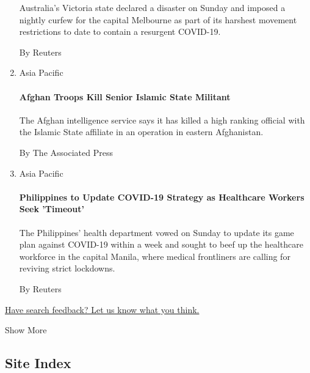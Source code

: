 \begin{enumerate}
  Australia's Victoria state declared a disaster on Sunday and imposed a
  nightly curfew for the capital Melbourne as part of its harshest
  movement restrictions to date to contain a resurgent COVID-19.

  By Reuters
\item
  Asia Pacific

  \href{/aponline/2020/08/02/world/asia/ap-as-afghanistan.html?searchResultPosition=9}{}

  \hypertarget{afghan-troops-kill-senior-islamic-state-militant}{%
  \paragraph{Afghan Troops Kill Senior Islamic State
  Militant}\label{afghan-troops-kill-senior-islamic-state-militant}}

  The Afghan intelligence service says it has killed a high ranking
  official with the Islamic State affiliate in an operation in eastern
  Afghanistan.

  By The Associated Press
\item
  Asia Pacific

  \href{/reuters/2020/08/02/world/asia/02reuters-health-coronavirus-philippines.html?searchResultPosition=10}{}

  \hypertarget{philippines-to-update-covid-19-strategy-as-healthcare-workers-seek-timeout}{%
  \paragraph{Philippines to Update COVID-19 Strategy as Healthcare
  Workers Seek
  'Timeout'}\label{philippines-to-update-covid-19-strategy-as-healthcare-workers-seek-timeout}}

  The Philippines' health department vowed on Sunday to update its game
  plan against COVID-19 within a week and sought to beef up the
  healthcare workforce in the capital Manila, where medical frontliners
  are calling for reviving strict lockdowns.

  By Reuters
\end{enumerate}

\href{http://nyt.qualtrics.com/jfe/form/SV_ehZpyzWtbwO9HVj?v=a}{Have
search feedback? Let us know what you think.}

Show More

\hypertarget{site-index}{%
\subsection{Site Index}\label{site-index}}

